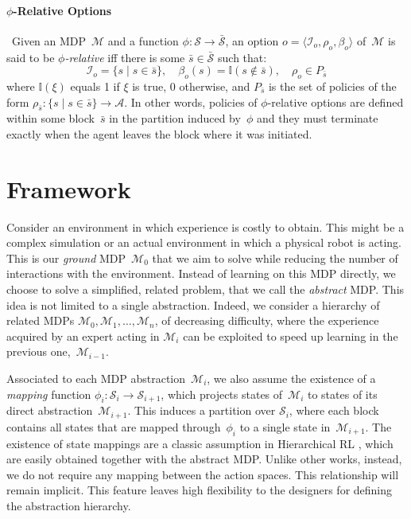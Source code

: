 \documentclass[letterpaper]{article} %
\theoremstyle{plain}
\theoremstyle{definition}
\theoremstyle{remark}
\newcommand{\Indicator}{\mathbb{I}}
\newcommand{\SetSym}[1]{\mathcal{#1}}
\newcommand{\Policy}{\rho}
\newcommand{\PolicySpace}{P}  %
\newcommand{\States}{\SetSym{S}}
\newcommand{\Actions}{\SetSym{A}}
\newcommand{\Model}{\SetSym{M}}
\newcommand{\Mapping}{\phi}
\newcommand{\Abst}[1]{\bar{#1}}
\begin{document}
\paragraph{$\Mapping$-Relative Options}
\cite{abel_2020_ValuePreserving}\, Given an MDP~$\Model$ and a function $\Mapping:
\States \to \Abst\States$, an option $o = \langle \SetSym{I}_o, \Policy_o, \beta_o
\rangle$ of~$\Model$ is said to be \emph{$\Mapping$-relative} iff there is
some $\Abst{s} \in \Abst{\States}$ such that:
\begin{equation}
\SetSym{I}_o = \{s \mid s \in \Abst{s}\},\quad
\beta_o(s) = \Indicator(s \not\in \Abst{s}),\quad
\Policy_o \in \PolicySpace_{\Abst{s}}
\end{equation}
where $\Indicator(\xi)$ equals 1 if $\xi$ is true, $0$ otherwise, and
$\PolicySpace_{\Abst{s}}$ is the set of policies of the form
$\Policy_{\Abst{s}}: \{ s \mid s \in \Abst{s} \} \to \Actions$.
In other words, policies of $\Mapping$-relative options are defined within some block~$\Abst{s}$ in the partition induced by~$\Mapping$
and they must terminate exactly when the agent leaves the block where it was initiated.


\section{Framework}

Consider an environment in which experience is costly to obtain.
This might be a complex simulation or an actual environment in which a physical robot is acting.
This is our \emph{ground} MDP~$\Model_0$ that we aim to solve while reducing the number of interactions with the environment.
Instead of learning on this MDP directly, we choose to solve a simplified, related problem, that we call the \emph{abstract} MDP.
This idea is not limited to a single abstraction.
Indeed, we consider a hierarchy of related MDPs $\Model_0, \Model_1, \dots, \Model_n$, of decreasing difficulty, where the experience acquired by an expert acting in $\Model_i$ can be exploited to speed up learning in the previous one,~$\Model_{i-1}$.

Associated to each MDP abstraction~$\Model_i$, we also assume the existence of a \emph{mapping} function ${\Mapping_i: \States_i \to \States_{i+1}}$, which projects states of~$\Model_i$ to states of its direct abstraction~$\Model_{i+1}$.
This induces a partition over $\States_i$, where each block contains
all states that are mapped through~$\Mapping_{i}$ to a single state in~$\Model_{i+1}$.
The existence of state mappings are a classic assumption in Hierarchical RL
\cite{ravindran_model_2002,abel_2016_OptimalBehavior,abel_2020_ValuePreserving},
which are easily obtained together with the abstract MDP.
Unlike other works, instead, we do not require any mapping between the action spaces.
This relationship will remain implicit.
This feature leaves high flexibility to the designers for defining the abstraction hierarchy.
\end{document}
